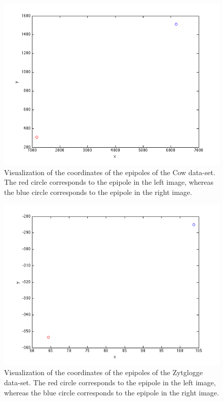 \documentclass{paper}
\begin{document}
\begin{figure}[H]
\centering
\includegraphics[width=\textwidth]{figures/epipole_cow}
\caption{Visualization of the coordinates of the epipoles of the Cow data-set. The red circle corresponds to the epipole in the left image, whereas the blue circle corresponds to the epipole in the right image.}
\label{fig:cow_epipole}
\end{figure}

\begin{figure}[H]
\centering
\includegraphics[width=\textwidth]{figures/epipole_zyt}
\caption{Visualization of the coordinates of the epipoles of the Zytglogge data-set. The red circle corresponds to the epipole in the left image, whereas the blue circle corresponds to the epipole in the right image.}
\label{fig:zyt_epipole}
\end{figure}
\end{document}
